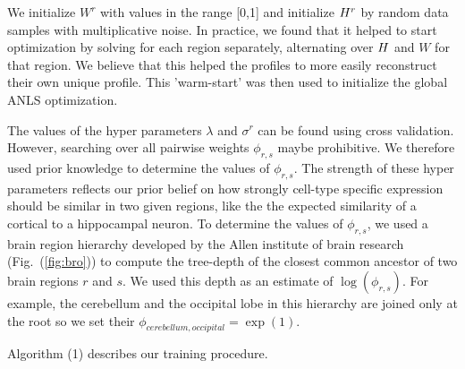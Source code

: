 \documentclass{article} %
\newcommand{\W}{W}
\newcommand{\figref}[1]{Fig.~(\ref{#1})}
\begin{document}
We initialize $\W^r$ with values in the range [0,1] and initialize ${H}^r$ by random data samples with multiplicative noise. In practice, we found that it helped to start optimization by solving for each region separately, alternating over ${H}$ and $\W$ for that region. We believe that this helped the profiles to more easily reconstruct their own unique profile. This 'warm-start' was then used to initialize the global ANLS optimization. 

The values of the hyper parameters $\lambda$ and $\sigma^r$ can be found using cross validation. However, searching over all pairwise weights $\phi_{r,s}$ maybe prohibitive. We therefore used prior knowledge to determine the values of $\phi_{r,s}$. The strength of these hyper parameters reflects our prior belief on how strongly cell-type specific expression should be similar in two given regions, like the the expected similarity of a cortical to a hippocampal neuron.
To determine the values of $\phi_{r,s}$, we used a brain region hierarchy developed by the Allen institute of brain research (\figref{fig:bro}) to compute the tree-depth of the closest common ancestor of two brain regions $r$ and $s$. We used this depth as an estimate of $\log(\phi_{r,s})$. For example, the cerebellum and the occipital lobe  in this hierarchy are joined only at the root so we set their $\phi_{cerebellum, occipital} = \exp(1)$. 

Algorithm (1) describes our training procedure.
\end{document}
